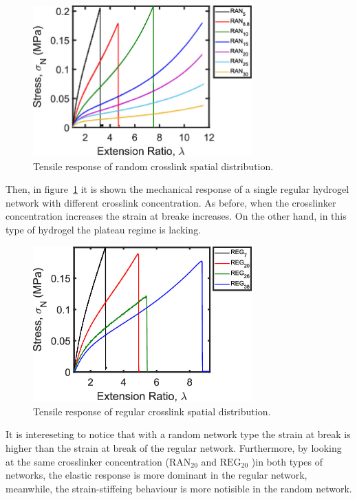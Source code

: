 \begin{figure}[ht!]
    \centering
    \includegraphics[width=0.75\textwidth]{figs/explainMechResponse/singleRANtensile.jpeg}
    \caption{Tensile response of random crosslink spatial distribution\citep{kongEffectCrossLinkHomogeneity2024}.}\label{fig:RANnetworks}
\end{figure}

Then, in figure~\ref{fig:RANnetworks} it is shown the mechanical response of a single regular hydrogel network with different crosslink concentration.
As before, when the crosslinker concentration increases the strain at breake increases.
On the other hand, in this type of hydrogel the plateau regime is lacking.

\begin{figure}[ht!]
    \centering
    \includegraphics[width=0.75\textwidth]{figs/explainMechResponse/singleREGtensile.jpeg}
    \caption{Tensile response of regular crosslink spatial distribution\citep{kongEffectCrossLinkHomogeneity2024}.}\label{fig:REGnetworks}
\end{figure}

It is intereseting to notice that with a random network type the strain at break is higher than the strain at break of the regular network.
Furthermore, by looking at the same crosslinker concentration ($\mathrm{RAN}_{20}$ and $\mathrm{REG}_{20}$ )in both types of networks, the elastic response is more dominant in the regular network, meanwhile, the strain-stiffeing behaviour is more notisible in the random network. 

